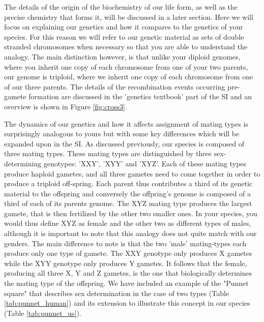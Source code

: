 \documentclass{report}
\begin{document}
The details of the origin of the biochemistry of our life form, as well as the precise chemistry that forms it, will be discussed in a later section. Here we will focus on explaining our genetics and how it compares to the genetics of your species. For this reason we will refer to our genetic material as sets of double stranded chromosomes when necessary so that you are able to understand the analogy. The main distinction however, is that unlike your diploid genomes, where you inherit one copy of each chromosome from one of your two parents, our genome is triploid, where we inherit one copy of each chromosome from one of our three parents. The details of the recombination events occurring pre-gamete formation are discussed in the 'genetics textbook' part of the SI and an overview is shown in Figure \ref{fig:cross3}.

The dynamics of our genetics and how it affects assignment of mating types is surprisingly analogous to yours but with some key differences which will be expanded upon in the SI. As discussed previously, 
our species is composed of three mating types. These mating types are distinguished by three sex-determining genotypes: 'XXY', 'XYY' and 'XYZ'.
Each of these mating types produce haploid gametes, and all three gametes need to come together in order to produce a triploid off-spring. Each parent thus contributes a third of its genetic material to the offspring and conversely the offpring's genome is composed of a third of each of its parents genome.
The XYZ mating type produces the largest gamete, that is then fertilized by the other two smaller ones. In your species, you would thus define XYZ as female and the other two as different types of males, although it is important to note that this analogy does not quite match with our genders. The main difference to note is that the two 'male' mating-types each produce only one type of gamete. The XXY genotype only produces X gametes while the XYY genotype only produces Y gametes. It follows that the female, producing all three X, Y and Z gametes, is the one that biologically determines the mating type of the offspring. We have included an example of the "Punnet square" that describes sex determination in the case of two types (Table \ref{tab:punnet_human}) and its extension to illustrate this concept in our species (Table \ref{tab:punnet_us}). 
\end{document}
